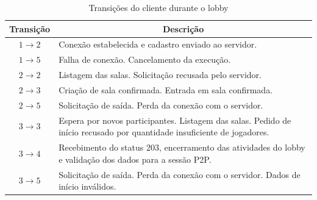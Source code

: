 \documentclass[11pt,a4paper]{article}
\begin{document}
\begin{table}[H]
    \centering
    \caption{Transições do cliente durante o lobby}
    \label{tab:fsm_cliente_lobby_transicoes}
    \begin{tabular}{|c|p{11.7cm}|}
        \hline
        \textbf{Transição} &
        \multicolumn{1}{c|}{\textbf{Descrição}} \\ \hline

        $1 \rightarrow 2$ &
        Conexão estabelecida e cadastro enviado ao servidor. \\ \hline

        $1 \rightarrow 5$ &
        Falha de conexão.
        \newline
        Cancelamento da execução. \\ \hline

        $2 \rightarrow 2$ &
        Listagem das salas.
        \newline
        Solicitação recusada pelo servidor. \\ \hline

        $2 \rightarrow 3$ &
        Criação de sala confirmada.
        \newline
        Entrada em sala confirmada. \\ \hline

        $2 \rightarrow 5$ &
        Solicitação de saída.
        \newline
        Perda da conexão com o servidor. \\ \hline

        $3 \rightarrow 3$ &
        Espera por novos participantes.
        \newline
        Listagem das salas.
        \newline
        Pedido de início recusado por quantidade insuficiente de jogadores. \\ \hline

        $3 \rightarrow 4$ &
        Recebimento do status 203, encerramento das atividades do lobby e validação dos dados para a sessão P2P. \\ \hline

        $3 \rightarrow 5$ &
        Solicitação de saída.
        \newline
        Perda da conexão com o servidor.
        \newline
        Dados de início inválidos. \\ \hline
    \end{tabular}
\end{table}
\end{document}
